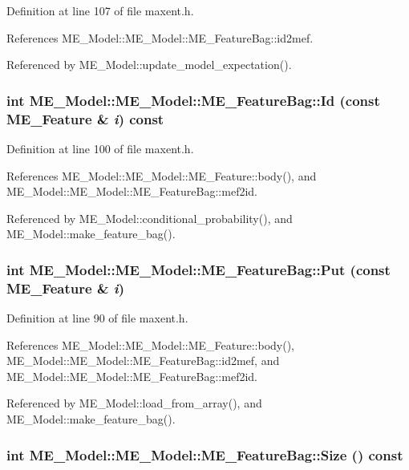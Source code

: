 Definition at line 107 of file maxent.h.

References ME\_\-Model::ME\_\-Model::ME\_\-FeatureBag::id2mef.

Referenced by ME\_\-Model::update\_\-model\_\-expectation().\hypertarget{structME__Model_1_1ME__FeatureBag_91a032b84cb004c2aa9819bd5c727e29}{
\subsubsection[{Id}]{\setlength{\rightskip}{0pt plus 5cm}int ME\_\-Model::ME\_\-Model::ME\_\-FeatureBag::Id (const {\bf ME\_\-Feature} \& {\em i}) const}}
\label{structME__Model_1_1ME__FeatureBag_91a032b84cb004c2aa9819bd5c727e29}




Definition at line 100 of file maxent.h.

References ME\_\-Model::ME\_\-Model::ME\_\-Feature::body(), and ME\_\-Model::ME\_\-Model::ME\_\-FeatureBag::mef2id.

Referenced by ME\_\-Model::conditional\_\-probability(), and ME\_\-Model::make\_\-feature\_\-bag().\hypertarget{structME__Model_1_1ME__FeatureBag_48df0cadbce52d82f012afd809d0eed4}{
\subsubsection[{Put}]{\setlength{\rightskip}{0pt plus 5cm}int ME\_\-Model::ME\_\-Model::ME\_\-FeatureBag::Put (const {\bf ME\_\-Feature} \& {\em i})}}
\label{structME__Model_1_1ME__FeatureBag_48df0cadbce52d82f012afd809d0eed4}




Definition at line 90 of file maxent.h.

References ME\_\-Model::ME\_\-Model::ME\_\-Feature::body(), ME\_\-Model::ME\_\-Model::ME\_\-FeatureBag::id2mef, and ME\_\-Model::ME\_\-Model::ME\_\-FeatureBag::mef2id.

Referenced by ME\_\-Model::load\_\-from\_\-array(), and ME\_\-Model::make\_\-feature\_\-bag().\hypertarget{structME__Model_1_1ME__FeatureBag_ef349bd03d50de36081b42ee5c717b86}{
\subsubsection[{Size}]{\setlength{\rightskip}{0pt plus 5cm}int ME\_\-Model::ME\_\-Model::ME\_\-FeatureBag::Size () const}}
\label{structME__Model_1_1ME__FeatureBag_ef349bd03d50de36081b42ee5c717b86}




